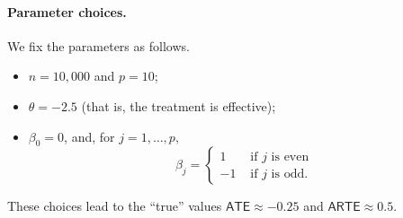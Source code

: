 \documentclass[11pt]{article}
\begin{document}
\paragraph{Parameter choices.} We fix the parameters as follows.
\begin{itemize}
    \item $n=10,000$ and $p=10$;
    \item $\theta = -2.5$ (that is, the treatment is effective);
    \item $\beta_0 = 0$, and, for $j=1,\dots,p,$
    \[
        \beta_j = \begin{cases}
        1 &\text{ if $j$ is even}\\
        -1  &\text{ if $j$ is odd}.
        \end{cases}
    \]
\end{itemize}
These choices lead to the ``true'' values $\textsf{ATE}\approx -0.25$ and $\textsf{ARTE} \approx 0.5$.
\end{document}
